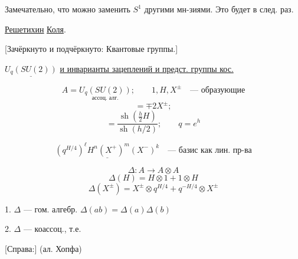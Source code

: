 Замечательно, что можно заменить $S^1$ другими мн-зиями.
Это будет в след. раз.

\underline{\underline{Решетихин}} \underline{Коля}.

[Зачёркнуто и подчёркнуто: Квантовые группы.]

$\underline{U_q(SU(2))}$ \underline{и инварианты зацеплений и предст. группы кос.}

\begin{equation*}
A=\underset{\text{ассоц. алг.}}{U_q(SU(2))};\qquad
1,H,X^\pm\quad\text{— образующие}
\end{equation*}
\begin{equation*}
[X^\pm,H]=\mp2X^\pm;
\tag{1}
\end{equation*}
\begin{equation*}
[X^+,X^-]=\frac{\operatorname{sh}\left(\frac h2 H\right)}{\operatorname{sh}(h/2)};
\qquad q=e^h
\end{equation*}


\begin{equation*}
\underline{\left(q^{H/4}\right)^\ell H^n(X^+)^m(X^-)^k}
\quad\text{— базис как лин. пр-ва}
\tag{2}
\end{equation*}

\begin{equation*}
\Delta:A\to A\otimes A
\end{equation*}
\begin{equation*}
\Delta(H)=H\otimes1+1\otimes H
\tag{3}
\end{equation*}
\begin{equation*}
\Delta(X^\pm)=X^\pm\otimes q^{H/4}+q^{-H/4}\otimes X^\pm
\end{equation*}

1. $\Delta$ — гом. алгебр. $\Delta(ab)=\Delta(a)\Delta(b)$

2. $\Delta$ — коассоц., т.е.
\begin{center}
\end{center}
[Справа:] (ал. Хопфа)

